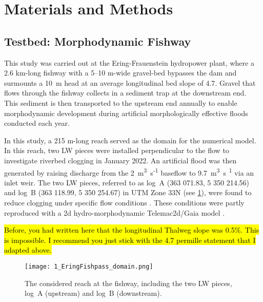 \documentclass[draft,linenumbers,onecolumn]{agujournal2019} %
\begin{document}
\section{Materials and Methods} 
\label{sec:methods}

\subsection{Testbed: Morphodynamic Fishway}
\label{sec:testbed}

This study was carried out at the Ering-Frauenstein hydropower plant, where a 2.6 km-long fishway with a 5--10 m-wide gravel-bed bypasses the dam and surmounts a 10~m head at an average longitudinal bed slope of 4.7\textperthousand \cite{zauner2020wie}. Gravel that flows through the fishway collects in a sediment trap at the downstream end. This sediment is then transported to the upstream end annually to enable morphodynamic development during artificial morphologically effective floods conducted each year.

In this study, a 215 m-long reach served as the domain for the numerical model. In this reach, two LW pieces were installed perpendicular to the flow to investigate riverbed clogging in  January 2022. An artificial flood was then generated by raising discharge from the 2~m\textsuperscript{3}~s\textsuperscript{-1} baseflow to 9.7~m\textsuperscript{3}~s\textsuperscript{~1} via an inlet weir. The two LW pieces, referred to as log~A (363 071.83, 5 350 214.56) and log~B (363 118.99, 5 350 254.67) in UTM Zone 33N (see \ref{fig:study-area}), were found to reduce clogging under specific flow conditions \cite{schwindt2023fuzzylogic,schalko2021flow,schalko2024flow}. These conditions were partly reproduced with a 2d hydro-morphodynamic Telemac2d/Gaia model \cite{scolari2025hydromorphodynamic}.

\hl{Before, you had written here that the longitudinal Thalweg slope was 0.5\%. This is impossible. I recommend you just stick with the 4.7 permille statement that I adapted above.}


\begin{figure}[htbp]
	\centering
	\texttt{[image: 1\_EringFishpass\_domain.png]}
	\caption{The considered reach at the fishway, including the two LW pieces, log~A (upstream) and log~B (downstream).	}
	\label{fig:study-area}
\end{figure}
\end{document}
